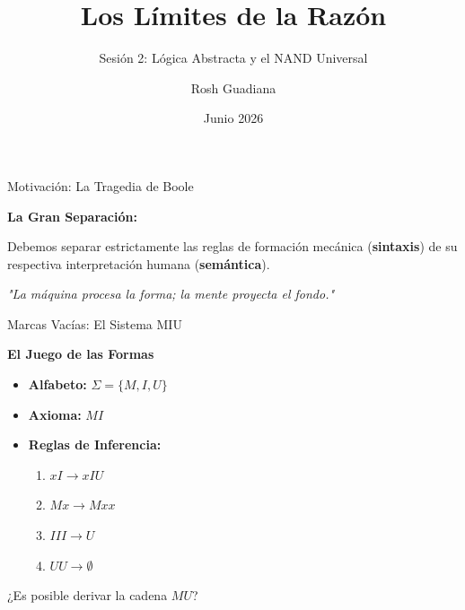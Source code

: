 \documentclass[10pt, aspectratio=169]{beamer}
\title{Los Límites de la Razón}
\subtitle{Sesión 2: Lógica Abstracta y el NAND Universal}
\author{Rosh Guadiana}
\date{Junio 2026}
\begin{document}
\maketitle

\begin{frame}{Motivación: La Tragedia de Boole}
    \begin{center}
        \vspace{0.5cm}
        
        \alert{\textbf{La Gran Separación:}}
        
        \vspace{0.3cm}
        \normalsize
        Debemos separar estrictamente las reglas de formación mecánica (\textbf{sintaxis}) de su respectiva interpretación humana (\textbf{semántica}).
        
        \vspace{1.0cm}
        \textit{"La máquina procesa la forma; la mente proyecta el fondo."}
    \end{center}
\end{frame}

\begin{frame}{Marcas Vacías: El Sistema MIU}
    \begin{center}
        \Large \textbf{El Juego de las Formas}
    \end{center}
    
    \vspace{0.4cm}
    \begin{itemize}
        \large
        \item \textbf{Alfabeto:} $\Sigma = \{M, I, U\}$
        \item \textbf{Axioma:} $MI$
        \item \textbf{Reglas de Inferencia:}
        \begin{enumerate}
            \normalsize
            \item $xI \to xIU$
            \item $Mx \to Mxx$
            \item $III \to U$
            \item $UU \to \emptyset$
        \end{enumerate}
    \end{itemize}

    \vspace{0.6cm}
    \begin{center}
        \alert{\large ¿Es posible derivar la cadena $MU$?}
    \end{center}
\end{frame}
\end{document}
